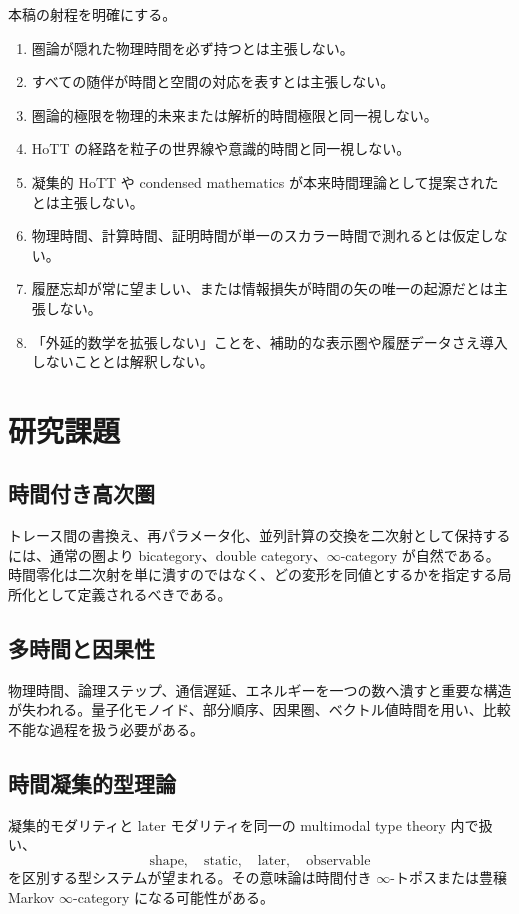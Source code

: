 \documentclass[a4paper,11pt]{ltjsarticle}
\theoremstyle{remark}
\begin{document}
本稿の射程を明確にする。
\begin{enumerate}
  \item 圏論が隠れた物理時間を必ず持つとは主張しない。
  \item すべての随伴が時間と空間の対応を表すとは主張しない。
  \item 圏論的極限を物理的未来または解析的時間極限と同一視しない。
  \item HoTT の経路を粒子の世界線や意識的時間と同一視しない。
  \item 凝集的 HoTT や condensed mathematics が本来時間理論として提案されたとは主張しない。
  \item 物理時間、計算時間、証明時間が単一のスカラー時間で測れるとは仮定しない。
  \item 履歴忘却が常に望ましい、または情報損失が時間の矢の唯一の起源だとは主張しない。
  \item 「外延的数学を拡張しない」ことを、補助的な表示圏や履歴データさえ導入しないこととは解釈しない。
\end{enumerate}

\section{研究課題}

\subsection{時間付き高次圏}
トレース間の書換え、再パラメータ化、並列計算の交換を二次射として保持するには、通常の圏より bicategory、double category、$\infty$-category が自然である。時間零化は二次射を単に潰すのではなく、どの変形を同値とするかを指定する局所化として定義されるべきである。

\subsection{多時間と因果性}
物理時間、論理ステップ、通信遅延、エネルギーを一つの数へ潰すと重要な構造が失われる。量子化モノイド、部分順序、因果圏、ベクトル値時間を用い、比較不能な過程を扱う必要がある。

\subsection{時間凝集的型理論}
凝集的モダリティと later モダリティを同一の multimodal type theory 内で扱い、
\begin{equation}
 \text{shape},\quad
 \text{static},\quad
 \text{later},\quad
 \text{observable}
\end{equation}
を区別する型システムが望まれる。その意味論は時間付き $\infty$-トポスまたは豊穣 Markov $\infty$-category になる可能性がある。
\end{document}
